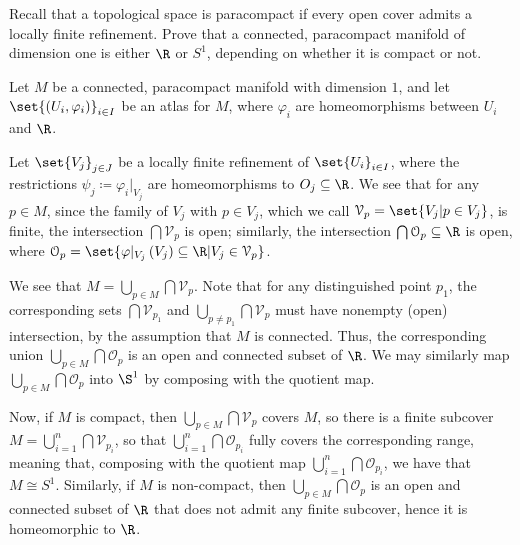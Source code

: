 \documentclass[10pt]{mypackage}
\begin{document}
\begin{problem}[Problem 4]
  Recall that a topological space is paracompact if every open cover admits a locally finite refinement. Prove that a connected, paracompact manifold of dimension one is either $\R$ or $S^{1}$, depending on whether it is compact or not.
\end{problem}
\begin{solution}
  Let $M$ be a connected, paracompact manifold with dimension $1$, and let $\set{\left( U_i,\varphi_i \right)}_{i\in I}$ be an atlas for $M$, where $\varphi_i$ are homeomorphisms between $U_i$ and $\R$.\newline

  Let $\set{V_{j}}_{j\in J}$ be a locally finite refinement of $\set{U_i}_{i\in I}$, where the restrictions $\psi_j \coloneq \varphi_i|_{V_j}$ are homeomorphisms to $O_{j}\subseteq \R$. We see that for any $p\in M$, since the family of $V_j$ with $p\in V_j$, which we call $\mathcal{V}_p = \set{V_j | p\in V_j}$, is finite, the intersection $\bigcap \mathcal{V}_p$ is open; similarly, the intersection $\bigcap \mathcal{O}_p\subseteq \R$ is open, where $\mathcal{O}_p = \set{\varphi\vert_{V_j}\left( V_j \right)\subseteq \R | V_j\in \mathcal{V}_p}$.\newline

  We see that $M = \bigcup_{p\in M} \bigcap \mathcal{V}_p$. Note that for any distinguished point $p_1$, the corresponding sets $\bigcap \mathcal{V}_{p_1}$ and $\bigcup_{p\neq p_1} \bigcap \mathcal{V}_{p}$ must have nonempty (open) intersection, by the assumption that $M$ is connected. Thus, the corresponding union $\bigcup_{p\in M}\bigcap \mathcal{O}_p$ is an open and connected subset of $\R$. We may similarly map $\bigcup_{p\in M} \bigcap \mathcal{O}_p$ into $\S^1$ by composing with the quotient map.\newline

  Now, if $M$ is compact, then $\bigcup_{p\in M}\bigcap \mathcal{V}_p$ covers $M$, so there is a finite subcover $M = \bigcup_{i=1}^{n}\bigcap \mathcal{V}_{p_i}$, so that $\bigcup_{i=1}^{n}\bigcap \mathcal{O}_{p_i}$ fully covers the corresponding range, meaning that, composing with the quotient map $\bigcup_{i=1}^{n} \bigcap \mathcal{O}_{p_i}$, we have that $M \cong S^{1}$. Similarly, if $M$ is non-compact, then $\bigcup_{p\in M}\bigcap\mathcal{O}_p$ is an open and connected subset of $\R$ that does not admit any finite subcover, hence it is homeomorphic to $\R$.
\end{solution}
\end{document}
